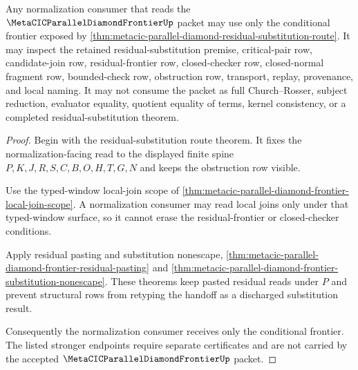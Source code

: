 \begin{theorem}
\label{thm:metacic-parallel-diamond-normalization-frontier-handoff}
Any normalization consumer that reads the $\MetaCICParallelDiamondFrontierUp$ packet may use only the conditional frontier exposed by \autoref{thm:metacic-parallel-diamond-residual-substitution-route}. It may inspect the retained residual-substitution premise, critical-pair row, candidate-join row, residual-frontier row, closed-checker row, closed-normal fragment row, bounded-check row, obstruction row, transport, replay, provenance, and local naming. It may not consume the packet as full Church--Rosser, subject reduction, evaluator equality, quotient equality of terms, kernel consistency, or a completed residual-substitution theorem.
\end{theorem}
\begin{proof}
Begin with the residual-substitution route theorem. It fixes the normalization-facing read to the displayed finite spine $P,K,J,R,S,C,B,O,H,T,G,N$ and keeps the obstruction row visible.

Use the typed-window local-join scope of \autoref{thm:metacic-parallel-diamond-frontier-local-join-scope}. A normalization consumer may read local joins only under that typed-window surface, so it cannot erase the residual-frontier or closed-checker conditions.

Apply residual pasting and substitution nonescape, \autoref{thm:metacic-parallel-diamond-frontier-residual-pasting} and \autoref{thm:metacic-parallel-diamond-frontier-substitution-nonescape}. These theorems keep pasted residual reads under $P$ and prevent structural rows from retyping the handoff as a discharged substitution result.

Consequently the normalization consumer receives only the conditional frontier. The listed stronger endpoints require separate certificates and are not carried by the accepted $\MetaCICParallelDiamondFrontierUp$ packet.
\end{proof}

